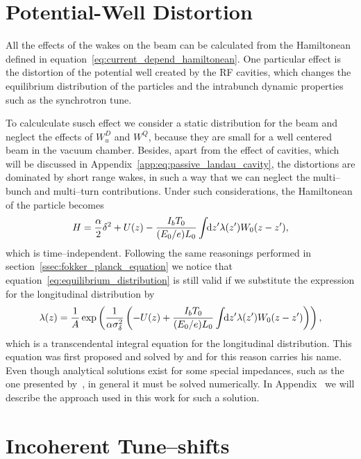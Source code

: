 \section{Potential-Well Distortion}

    All the effects of the wakes on the beam can be calculated from the Hamiltonean defined in equation~\eqref{eq:current_depend_hamiltonean}. One particular effect is the distortion of the potential well created by the RF cavities, which changes the equilibrium distribution of the particles and the intrabunch dynamic properties such as the synchrotron tune.

    To calculculate susch effect we consider a static distribution for the beam and neglect the effects of $W^D_u$ and $W^Q$, because they are small for a well centered beam in the vacuum chamber. Besides, apart from the effect of cavities, which will be discussed in Appendix~\ref{app:eq:passive_landau_cavity}, the distortions are dominated by short range wakes, in such a way that we can neglect the multi--bunch and multi--turn contributions. Under such considerations, the Hamiltonean of the particle becomes
    \begin{align}
        H = \frac\alpha2\delta^2 + U(z) -
            \frac{I_bT_0}{(E_0/e)L_0}\int\!\!\text{d}z' \lambda(z') W_0(z-z'),
    \end{align}
    which is time--independent. Following the same reasonings performed in section~\ref{ssec:fokker_planck_equation} we notice that equation~\ref{eq:equilibrium_distribution} is still valid if we substitute the expression for the longitudinal distribution by
    \begin{align}\label{eq:haissinski_equation}
        \lambda(z) = \frac1A\exp\left(\frac{1}{\alpha\sigma_\delta^2}\left(
            -U(z) + \frac{I_bT_0}{(E_0/e)L_0}\int\!\!\text{d}z' \lambda(z') W_0(z-z')\right)\right),
    \end{align}
    which is a transcendental integral equation for the longitudinal distribution. This equation was first proposed and solved by  and for this reason carries his name. Even though analytical solutions exist for some special impedances, such as the one presented by~, in general it must be solved numerically. In Appendix~\cite{app:codes_developed} we will describe the approach used in this work for such a solution.

\section{Incoherent Tune--shifts}

